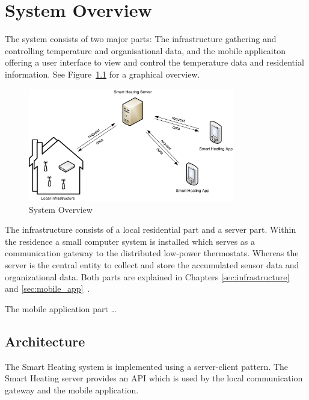 
\chapter{System Overview}
\label{sec:system_overview}

The system consists of two major parts: The infrastructure gathering and controlling temperature and organisational data, and the mobile applicaiton offering a user interface to view and control the temperature data and residential information. See Figure~\ref{fig:systemoverview} for a graphical overview.

\begin{figure}[h]
\begin{center}
\includegraphics[width=0.8\textwidth]{images/SystemOverview.png}
\end{center}
\caption{System Overview}
\label{fig:systemoverview}
\end{figure}

The infrastructure consists of a local residential part and a server part. Within the residence a small computer system is installed which serves as a communication gateway to the distributed low-power thermostats.
Whereas the server is the central entity to collect and store the accumulated sensor data and organizational data. Both parts are explained in Chapters \ref{sec:infrastructure}~ and \ref{sec:mobile_app}~.

The mobile application part \dots{}

\section{Architecture}

The Smart Heating system is implemented using a server-client pattern. The Smart Heating server provides an API which is used by the local communication gateway and the mobile application.


